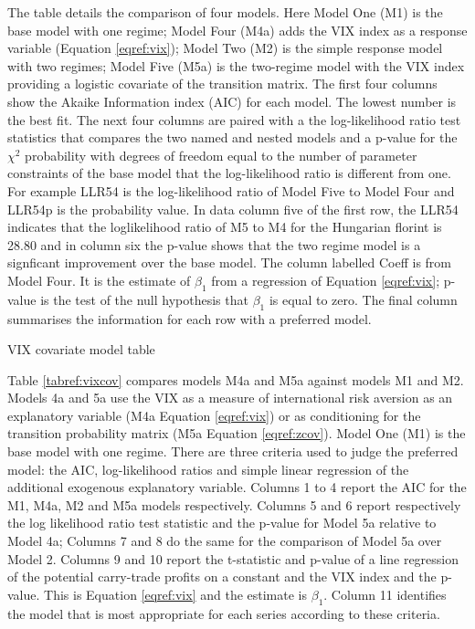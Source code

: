 \documentclass[12pt, a4paper, oneside]{article}\usepackage[]{graphicx}\usepackage[]{color}
\begin{document}
\begin{sidewaystable}[p]
\begin{threeparttable}
\begin{tablenotes}
\item The table details the comparison of four models. Here Model  One (M1) is the base model with one regime; Model Four (M4a) adds the VIX index as a response variable (Equation \ref{eqref:vix}); Model Two (M2) is the simple response model with two regimes; Model Five (M5a) is the two-regime model with the VIX index providing a logistic covariate of the transition matrix. The first four columns show the Akaike Information index (AIC) for each model.  The lowest number is the best fit.  The next four columns are paired with a the log-likelihood ratio test statistics that compares the two named and nested models and a p-value for the $\chi^2$ probability with degrees of freedom equal to the number of parameter constraints of the base model that the log-likelihood ratio is different from one.  For example LLR54 is the log-likelihood ratio of Model Five to Model Four and LLR54p is the probability value.  In data column five of the first row, the LLR54 indicates that the loglikelihood ratio of M5 to M4 for the Hungarian florint is 28.80 and in column six the p-value shows that the two regime model is a signficant improvement over the base model.  The column labelled Coeff is from Model Four.  It is the estimate of $\beta_1$ from a regression of Equation \ref{eqref:vix}; p-value is the test of the null hypothesis that $\beta_1$ is equal to zero.  The final column summarises the information for each row with a preferred model. 
\end{tablenotes}
\caption{VIX covariate model table}
\label{tabref:vixcov}
\end{threeparttable}
\end{sidewaystable}

Table \ref{tabref:vixcov} compares models M4a and M5a against models M1 and M2.  Models 4a and 5a use the VIX as a measure of international risk aversion as an explanatory variable (M4a Equation \ref{eqref:vix}) or as conditioning for the transition probability matrix (M5a Equation \ref{eqref:zcov}).  Model One (M1) is the base model with one regime. There are three criteria used to judge the preferred model: the AIC, log-likelihood ratios and simple linear regression of the additional exogenous explanatory variable. Columns 1 to 4 report the AIC for the M1, M4a, M2 and M5a models respectively.  Columns 5 and 6 report respectively the log likelihood ratio test statistic and the p-value for Model 5a relative to Model 4a; Columns 7 and 8 do the same for the comparison of Model 5a over Model 2.  Columns 9 and 10 report the t-statistic and p-value of a line regression of the potential carry-trade profits on a constant and the VIX index and the p-value. This is Equation \ref{eqref:vix} and the estimate is $\beta_1$.  Column 11 identifies the model that is most appropriate for each series according to these criteria.
\end{document}
